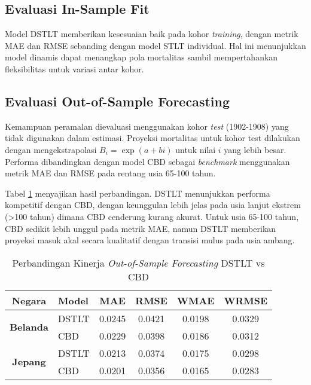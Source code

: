 \subsection{Evaluasi In-Sample Fit}

Model DSTLT memberikan kesesuaian baik pada kohor \textit{training}, dengan metrik MAE dan RMSE sebanding dengan model STLT individual. Hal ini menunjukkan model dinamis dapat menangkap pola mortalitas sambil mempertahankan fleksibilitas untuk variasi antar kohor.

\subsection{Evaluasi Out-of-Sample Forecasting}

Kemampuan peramalan dievaluasi menggunakan kohor \textit{test} (1902-1908) yang tidak digunakan dalam estimasi. Proyeksi mortalitas untuk kohor test dilakukan dengan mengekstrapolasi $B_i = \exp(a + bi)$ untuk nilai $i$ yang lebih besar. Performa dibandingkan dengan model CBD sebagai \textit{benchmark} menggunakan metrik MAE dan RMSE pada rentang usia 65-100 tahun.

Tabel \ref{tab:forecasting_comparison} menyajikan hasil perbandingan. DSTLT menunjukkan performa kompetitif dengan CBD, dengan keunggulan lebih jelas pada usia lanjut ekstrem (>100 tahun) dimana CBD cenderung kurang akurat. Untuk usia 65-100 tahun, CBD sedikit lebih unggul pada metrik MAE, namun DSTLT memberikan proyeksi masuk akal secara kualitatif dengan transisi mulus pada usia ambang.

\begin{table}[H]
\centering
\caption{Perbandingan Kinerja \textit{Out-of-Sample Forecasting} DSTLT vs CBD}
\label{tab:forecasting_comparison}
\small
\begin{tabular}{clcccc}
\hline
\textbf{Negara} & \textbf{Model} & \textbf{MAE} & \textbf{RMSE} & \textbf{WMAE} & \textbf{WRMSE} \\
\hline
\multirow{2}{*}{\textbf{Belanda}}
& DSTLT & 0.0245 & 0.0421 & 0.0198 & 0.0329 \\
& CBD & 0.0229 & 0.0398 & 0.0186 & 0.0312 \\
\hline
\multirow{2}{*}{\textbf{Jepang}}
& DSTLT & 0.0213 & 0.0374 & 0.0175 & 0.0298 \\
& CBD & 0.0201 & 0.0356 & 0.0165 & 0.0283 \\
\hline
\end{tabular}
\end{table}

